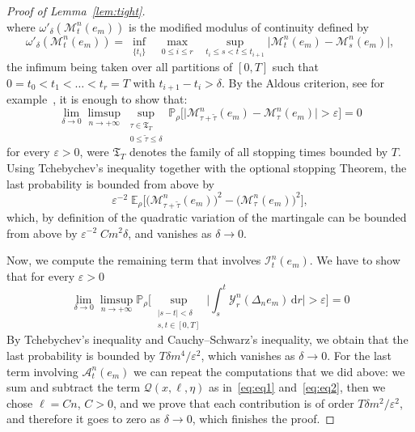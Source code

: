 \documentclass[10pt]{amsart}
\theoremstyle{definition}\newtheorem{defi}[theo]{Definition}\newtheorem{rema}[theo]{Remark}\newtheorem{exam}[theo]{Example}\newtheorem{exem}[theo]{Example}\newtheorem{nota}[theo]{Notation}
\newcommand{\mc}[1]{{\mathcal #1}}
\renewcommand{\mc}[1]{{\mathcal #1}}
\renewcommand{\leq}{\leqslant}
\renewcommand{\tilde}{\widetilde}
\renewcommand{\epsilon}{\varepsilon}
\newcommand*{\dd}{\mathrm{d}}
\newcommand*{\dr}{\dd r}
\begin{document}
\begin{proof}[Proof of Lemma~\ref{lem:tight}]
\begin{equation*}
\end{equation*}
where $\omega'_{\delta}(\mathcal{M}^{n}_t(e_m))$ is the modified modulus of continuity defined by
\begin{equation*}
\omega'_{\delta}(\mathcal{M}^{n}_t(e_m))=\inf_{\substack{\{t_{i}\}}}\;\max_{\substack{0\leq{i}\leq{r}}}\;\sup_{t_{i}
\leq{s}<{t}\leq{t_{i+1}}}\big|\mathcal{M}_{t}^{n}(e_m)-\mathcal{M}_{s}^{n}(e_m)\big|,
\end{equation*}
the infimum being taken over all partitions of $[0,T]$ such that $0=t_{0}<t_{1}<\dots<t_{r}=T$ with $t_{i+1}-t_{i}>\delta$. By the Aldous criterion, see for example~\cite[Proposition~4.1.6]{kl}, it is enough to show that:
\begin{equation*}
\lim_{\delta\rightarrow{0}}\limsup_{n\rightarrow{+\infty}}\sup_{\substack{\tau\in{\mathfrak {T}_{T}}\\0\leq{\tilde\tau}\leq{\delta}}}\mathbb{P}_{\rho}\Big[\big|\mathcal{M}_{\tau+\tilde\tau}^{n}(e_m)-\mathcal{M}_{\tau}^{n}(e_m)\big|>\epsilon\Big]=0
\end{equation*}
for every $\epsilon>0$, were $\mathfrak {T}_{T}$ denotes the family of all stopping times bounded by $T$. Using Tchebychev's inequality together with the optional stopping Theorem, the last probability is bounded from above by
\begin{equation*}
\epsilon^{-2}\;\mathbb{E}_{\rho}\Big[\big(\mathcal{M}_{\tau+\tilde\tau}^{n}(e_m)\big)^{2}-\big(\mathcal{M}_{\tau}^{n}(e_m)\big)^{2}\Big],
\end{equation*}
which, by definition of the quadratic variation of the martingale can be bounded from above by $\epsilon^{-2}\;Cm^2\delta$, and vanishes as $\delta\to 0$.

Now, we compute the remaining term that involves $\mathcal I_t^n(e_m)$. We have to show that for every $\epsilon>0$
\begin{equation*}
\lim_{\delta\rightarrow{0}}\limsup_{n\rightarrow{+\infty}}
\mathbb{P}_{\rho}\Bigg[\sup_{\substack{|s-t|<\delta\\s,t\in[0,T]}}\bigg|
\int_{s}^{t}\mathcal Y_r^n(\Delta_n e_m)\,\dr\bigg|>\epsilon\Bigg]=0
\end{equation*}
By Tchebychev's inequality and Cauchy--Schwarz's inequality, we obtain that the last probability is bounded by $T\delta m^4/\epsilon ^2$, which vanishes as $\delta\to0$. For the last term involving $\mathcal A_t^n(e_m)$ we can repeat the computations that we did above: we sum and subtract the term $\mc Q(x,\ell,\eta)$ as in~\eqref{eq:eq1} and~\eqref{eq:eq2}, then we chose $\ell = C n$, $C>0$, and we prove that each contribution is of order $T\delta m^2/\varepsilon^2$, and therefore it goes to zero as $\delta\to0$, which finishes the proof.
\end{proof}
\end{document}

